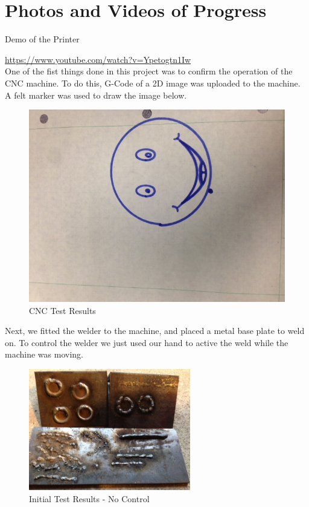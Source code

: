 \documentclass[12pt]{article}
\begin{document}
\clearpage


\section{Photos and Videos of Progress}

Demo of the Printer

\href{https://www.youtube.com/watch?v=Ypetogtn1Iw}{https://www.youtube.com/watch?v=Ypetogtn1Iw}\\

One of the fist things done in this project was to confirm the operation of the CNC machine. To do this, G-Code of a 2D image was uploaded to the machine. A felt marker was used to draw the image below. \\

\begin{figure}[!ht]
\centering
\includegraphics[scale=0.6]{pic1}
\caption{CNC Test Results}
\end{figure}

Next, we fitted the welder to the machine, and placed a metal base plate to weld on. To control the welder we just used our hand to active the weld while the machine was moving.

\clearpage


\begin{figure}[!ht]
\centering
\includegraphics[width=0.63\textwidth]{pic2}
\caption{Initial Test Results - No Control}
\end{figure}
\end{document}
